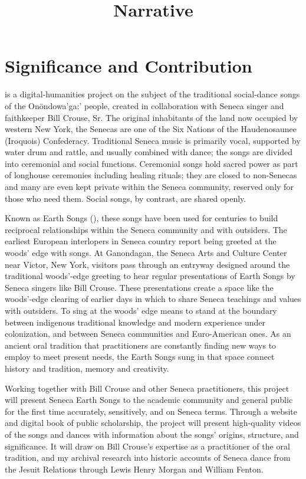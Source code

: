 \documentclass{neh}
\title{Narrative}
\begin{document}
\maketitle
\section{Significance and Contribution}
 is a digital-humanities project
on the subject of the traditional social-dance songs of the Onöndowa’ga:’
people, created in collaboration with Seneca singer and faithkeeper Bill
Crouse, Sr.
The original inhabitants of the land now occupied by western New York, the
Senecas are one of the Six Nations of the Haudenosaunee (Iroquois)
Confederacy.
Traditional Seneca music is primarily vocal, supported by water drum and
rattle, and usually combined with dance; the songs are divided into ceremonial
and social functions.
Ceremonial songs hold sacred power as part of longhouse ceremonies including
healing rituals; they are closed to non-Senecas and many are even kept private
within the Seneca community, reserved only for those who need them.
Social songs, by contrast, are shared openly.

Known as Earth Songs (), these songs have
been used for centuries to build reciprocal relationships within the Seneca
community and with outsiders.
The earliest European interlopers in Seneca country report being greeted at
the woods' edge with songs.
At Ganondagan, the Seneca Arts and Culture Center near Victor, New York,
visitors pass through an entryway designed around the traditional woods'-edge
greeting to hear regular presentations of Earth Songs by Seneca singers like
Bill Crouse.
These presentations create a space like the woods'-edge clearing of earlier
days in which to share Seneca teachings and values with outsiders.
To sing at the woods' edge means to stand at the boundary between indigenous
traditional knowledge and modern experience under colonization, and between
Seneca communities and Euro-American ones.
As an ancient oral tradition that practitioners are constantly finding new
ways to employ to meet present needs, the Earth Songs sung in that space
connect history and tradition, memory and creativity.

Working together with Bill Crouse and other Seneca practitioners, this project
will present Seneca Earth Songs to the academic community and general public
for the first time accurately, sensitively, and on Seneca terms.
Through a website and digital book of public scholarship, the project will
present high-quality videos of the songs and dances with information about
the songs' origins, structure, and significance.
It will draw on Bill Crouse's expertise as a practitioner of the oral
tradition, and my archival research into historic accounts of Seneca dance
from the Jesuit Relations through Lewis Henry Morgan and William Fenton.
\end{document}
